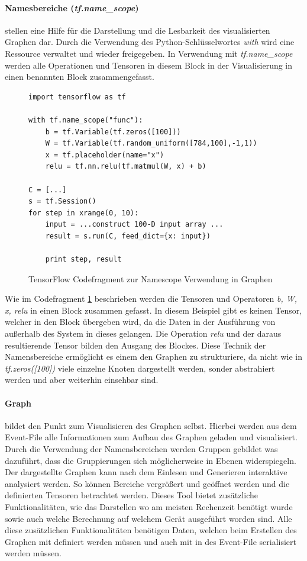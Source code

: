 \paragraph{Namesbereiche (\textit{tf.name\_scope})} stellen eine Hilfe für die Darstellung und die Lesbarkeit des visualisierten Graphen dar. 
Durch die Verwendung des Python-Schlüsselwortes \textit{with} wird eine Ressource verwaltet und wieder freigegeben. 
In Verwendung mit \textit{tf.name\_scope} werden alle Operationen und Tensoren in diesem Block in der Visualisierung in einen benannten Block zusammengefasst.
\begin{figure}[ht!]
\lstset{language=Python}
\begin{lstlisting}
import tensorflow as tf

with tf.name_scope("func"):
	b = tf.Variable(tf.zeros([100])) 
	W = tf.Variable(tf.random_uniform([784,100],-1,1)) 
	x = tf.placeholder(name="x") 
	relu = tf.nn.relu(tf.matmul(W, x) + b) 

C = [...] 
s = tf.Session()
for step in xrange(0, 10):
	input = ...construct 100-D input array ... 
	result = s.run(C, feed_dict={x: input}) 

	print step, result 
\end{lstlisting}

	\caption{TensorFlow Codefragment zur Namescope Verwendung in Graphen}
	\label{fig:NameScopeFragmentGraphDefinition}
\end{figure}
Wie im Codefragment \ref{fig:NameScopeFragmentGraphDefinition} beschrieben werden die Tensoren und Operatoren \textit{b, W, x, relu} in einen Block zusammen gefasst. 
In diesem Beispiel gibt es keinen Tensor, welcher in den Block übergeben wird, da die Daten in der Ausführung von außerhalb des System in dieses gelangen. 
Die Operation \textit{relu} und der daraus resultierende Tensor bilden den Ausgang des Blockes. 
Diese Technik der Namensbereiche ermöglicht es einem den Graphen zu strukturiere, da nicht wie in \textit{tf.zeros([100])} viele einzelne Knoten dargestellt werden, sonder abstrahiert werden und aber weiterhin einsehbar sind.

\paragraph{Graph} bildet den Punkt zum Visualisieren des Graphen selbst. 
Hierbei werden aus dem Event-File alle Informationen zum Aufbau des Graphen geladen und visualisiert. 
Durch die Verwendung der Namensbereichen werden Gruppen gebildet was dazuführt, dass die Gruppierungen sich möglicherweise in Ebenen widerspiegeln. 
Der dargestellte Graphen kann nach dem Einlesen und Generieren interaktive analysiert werden. 
So können Bereiche vergrößert und geöffnet werden und die definierten Tensoren betrachtet werden. 
Dieses Tool bietet zusätzliche Funktionalitäten, wie das Darstellen wo am meisten Rechenzeit benötigt wurde sowie auch welche Berechnung auf welchem Gerät ausgeführt worden sind. 
Alle diese zusätzlichen Funktionalitäten benötigen Daten, welchen beim Erstellen des Graphen mit definiert werden müssen und auch mit in des Event-File serialisiert werden müssen. 


